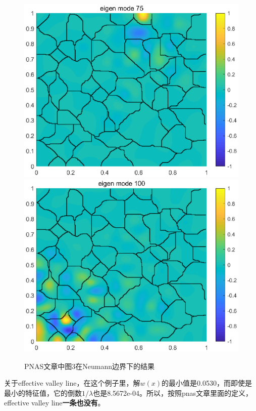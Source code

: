 \documentclass[UTF8,12pt]{article}
\begin{document}
\begin{figure}[htbp]
    \includegraphics[width=0.26\linewidth]{pic/pf3-75}
    \includegraphics[width=0.26\linewidth]{pic/pf3-100}
    \label{v2}
\caption{PNAS文章中图3在Neumann边界下的结果}
\end{figure}

关于effective valley line，在这个例子里，解$w(x)$的最小值是0.0530，而即使是最小的特征值，它的倒数$1 / \lambda$也是8.5672e-04。所以，按照pnas文章里面的定义，effective valley line\textbf{一条也没有}。
\end{document}

